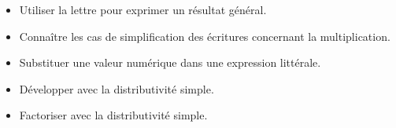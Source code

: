 \begin{prerequis}  
    \begin{itemize}  
        \item Utiliser la lettre pour exprimer un résultat général.
        \item Connaître les cas de simplification des écritures concernant la multiplication.
        \columnbreak
        \item Substituer une valeur numérique dans une expression littérale.
        \item Développer avec la distributivité simple.        
        \item Factoriser avec la distributivité simple.        
    \end{itemize}
\end{prerequis}
